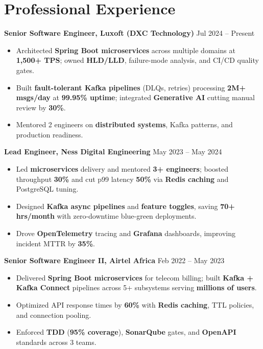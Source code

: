 \documentclass[11pt,a4paper]{article}
\begin{document}
\section{Professional Experience}

\textbf{Senior Software Engineer, Luxoft (DXC Technology)} \hfill Jul 2024 -- Present
\begin{itemize}
  \item Architected \textbf{Spring Boot microservices} across multiple domains at \textbf{1,500+ TPS}; owned \textbf{HLD/LLD}, failure-mode analysis, and CI/CD quality gates.
  \item Built \textbf{fault-tolerant Kafka pipelines} (DLQs, retries) processing \textbf{2M+ msgs/day} at \textbf{99.95\% uptime}; integrated \textbf{Generative AI} cutting manual review by \textbf{30\%}.
  \item Mentored 2 engineers on \textbf{distributed systems}, Kafka patterns, and production readiness.
\end{itemize}

\textbf{Lead Engineer, Ness Digital Engineering} \hfill May 2023 -- May 2024
\begin{itemize}
  \item Led \textbf{microservices} delivery and mentored \textbf{3+ engineers}; boosted throughput \textbf{30\%} and cut p99 latency \textbf{50\%} via \textbf{Redis caching} and PostgreSQL tuning.
  \item Designed \textbf{Kafka async pipelines} and \textbf{feature toggles}, saving \textbf{70+ hrs/month} with zero-downtime blue-green deployments.
  \item Drove \textbf{OpenTelemetry} tracing and \textbf{Grafana} dashboards, improving incident MTTR by \textbf{35\%}.
\end{itemize}

\textbf{Senior Software Engineer II, Airtel Africa} \hfill Feb 2022 -- May 2023
\begin{itemize}
  \item Delivered \textbf{Spring Boot microservices} for telecom billing; built \textbf{Kafka + Kafka Connect} pipelines across 5+ subsystems serving \textbf{millions of users}.
  \item Optimized API response times by \textbf{60\%} with \textbf{Redis caching}, TTL policies, and connection pooling.
  \item Enforced \textbf{TDD} (\textbf{95\% coverage}), \textbf{SonarQube} gates, and \textbf{OpenAPI} standards across 3 teams.
\end{itemize}
\end{document}
